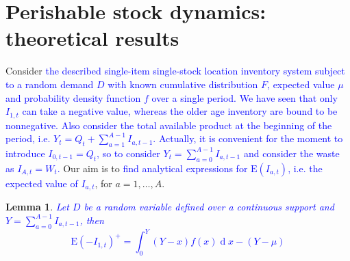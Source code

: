 \documentclass{tPRS2e}
\renewcommand{\d}[1]{\ensuremath{\operatorname{d}\!{#1}}}
\newcommand{\blue}{\textcolor{blue}}
\newtheorem{lem}{Lemma}
\begin{document}
\section{Perishable stock dynamics: theoretical results}\label{sec:theoretical_results}
%	
Consider \blue{the described single-item single-stock location inventory system subject to a random demand $D$ with known cumulative distribution $F$, expected value $\mu$ and probability density function $f$ over a single period.} %
\blue{We have seen that only $I_{1,t}$ can take a negative value, whereas the older age inventory are bound to be nonnegative. Also consider the total available product at the beginning of the period, i.e. $Y_t=Q_t+\sum_{a=1}^{A-1} I_{a,t-1}$. Actually, it is convenient for the moment to introduce $I_{0,t-1}=Q_t$, so to consider $Y_t=\sum_{a=0}^{A-1} I_{a,t-1}$ and consider the waste as $I_{A,t}=W_t$.}	
Our aim is to \blue{find analytical expressions for $\mathrm{E}(I_{a,t})$, i.e. the expected value of $I_{a,t}$}, for $a=1,\ldots,A$.
%	
\begin{lem} 
\blue{Let $D$ be a random variable defined over a continuous support and $Y=\sum_{a=0}^{A-1} I_{a,t-1}$, then
		 \[\mathrm{E}(-I_{1,t})^+=\int_0^Y(Y-x)f(x)\d x-(Y-\mu)\]}
	\end{lem}
\end{document}
